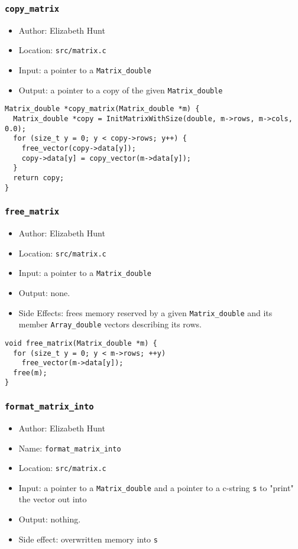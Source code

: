 \documentclass[11pt]{article}
\begin{document}
\subsubsection{\texttt{copy\_matrix}}
\label{sec:org63765c0}
\begin{itemize}
\item Author: Elizabeth Hunt
\item Location: \texttt{src/matrix.c}
\item Input: a pointer to a \texttt{Matrix\_double}
\item Output: a pointer to a copy of the given \texttt{Matrix\_double}
\end{itemize}

\begin{verbatim}
Matrix_double *copy_matrix(Matrix_double *m) {
  Matrix_double *copy = InitMatrixWithSize(double, m->rows, m->cols, 0.0);
  for (size_t y = 0; y < copy->rows; y++) {
    free_vector(copy->data[y]);
    copy->data[y] = copy_vector(m->data[y]);
  }
  return copy;
}
\end{verbatim}

\subsubsection{\texttt{free\_matrix}}
\label{sec:orgc337967}
\begin{itemize}
\item Author: Elizabeth Hunt
\item Location: \texttt{src/matrix.c}
\item Input: a pointer to a \texttt{Matrix\_double}
\item Output: none.
\item Side Effects: frees memory reserved by a given \texttt{Matrix\_double} and its member
\texttt{Array\_double} vectors describing its rows.
\end{itemize}

\begin{verbatim}
void free_matrix(Matrix_double *m) {
  for (size_t y = 0; y < m->rows; ++y)
    free_vector(m->data[y]);
  free(m);
}
\end{verbatim}

\subsubsection{\texttt{format\_matrix\_into}}
\label{sec:org6b188b4}
\begin{itemize}
\item Author: Elizabeth Hunt
\item Name: \texttt{format\_matrix\_into}
\item Location: \texttt{src/matrix.c}
\item Input: a pointer to a \texttt{Matrix\_double} and a pointer to a c-string \texttt{s} to "print" the vector out
into
\item Output: nothing.
\item Side effect: overwritten memory into \texttt{s}
\end{itemize}
\end{document}
